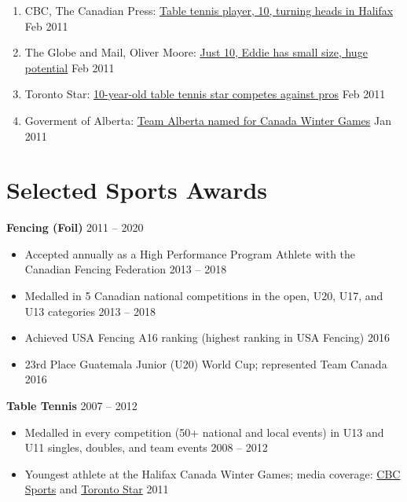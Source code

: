 \documentclass{article}
\begin{document}
\begin{enumerate}
    \item CBC, The Canadian Press: \href{https://www.cbc.ca/sports/2.723/table-tennis-player-10-turning-heads-in-halifax-1.1115785}{Table tennis player, 10, turning heads in Halifax} \hfill Feb 2011
    \item The Globe and Mail, Oliver Moore: \href{https://www.theglobeandmail.com/sports/more-sports/just-10-eddie-has-small-size-huge-potential/article567766/}{Just 10, Eddie has small size, huge potential} \hfill Feb 2011
    \item Toronto Star: \href{https://www.thestar.com/sports/10-year-old-table-tennis-star-competes-against-pros/article_6446b8a8-d20c-5a5b-99d4-c7a19640d067.html}{10-year-old table tennis star competes against pros} \hfill Feb 2011
    \item Goverment of Alberta: \href{https://www.alberta.ca/release.cfm?xID=297919A1CA1D0-A726-5DBB-1FF85C24472CEF84}{Team Alberta named for Canada Winter Games} \hfill Jan 2011
\end{enumerate}

\section*{\textcolor{my_colour}{Selected Sports Awards}}
\vspace{-.25em} \hrulefill \vspace{.25em}

\textbf{Fencing (Foil)} \hfill 2011 -- 2020
\begin{itemize}
    \item Accepted annually as a High Performance Program Athlete with the Canadian Fencing Federation \hfill 2013 -- 2018
    \item Medalled in 5 Canadian national competitions in the open, U20, U17, and U13 categories \hfill 2013 -- 2018
    \item Achieved USA Fencing A16 ranking (highest ranking in USA Fencing) \hfill 2016
    \item 23rd Place Guatemala Junior (U20) World Cup; represented Team Canada \hfill 2016
\end{itemize} \vspace{1em}
\textbf{Table Tennis} \hfill 2007 -- 2012
\begin{itemize}
    \item Medalled in every competition (50+ national and local events) in U13 and U11 singles, doubles, and team events \hfill 2008 -- 2012
    \item Youngest athlete at the Halifax Canada Winter Games; media coverage: \href{https://www.cbc.ca/sports/2.723/table-tennis-player-10-turning-heads-in-halifax-1.1115785}{CBC Sports} and \href{https://www.thestar.com/sports/2011/02/22/10yearold_table_tennis_star_competes_against_pros.html}{Toronto Star} \hfill 2011
\end{itemize}
\end{document}
